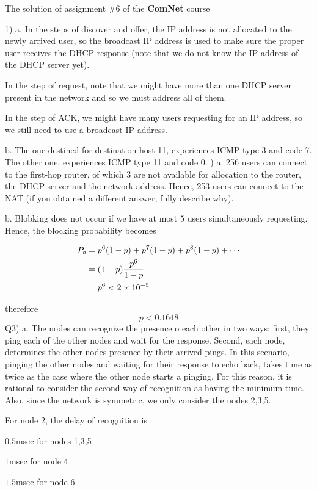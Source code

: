 \documentclass[10pt,letterpaper]{article}
\newcommand{\eqn}[2]{
\begin{equation}
\begin{split}
#1
\label{#2}
\end{split}
\end{equation}
}
\begin{document}
\Large
\begin{center}
The solution of assignment \#6 of the \textbf{ComNet} course
\end{center}
1) a. In the steps of discover and offer, the IP address is not allocated to the newly arrived user, so the broadcast IP address is used to make sure the proper user receives the DHCP response (note that we do not know the IP address of the DHCP server yet).

In the step of request, note that we might have more than one DHCP server present in the network and so we must address all of them.

In the step of ACK, we might have many users requesting for an IP address, so we still need to use a broadcast IP address.

b. The one destined for destination host 11, experiences ICMP type 3 and code 7. The other one, experiences ICMP type 11 and code 0.
\newline{})
a. 256 users can connect to the first-hop router, of which 3 are not available for allocation to the router, the DHCP server and the network address. Hence, 253 users can connect to the NAT (if you obtained a different answer, fully describe why).

b. Blobking does not occur if we have at most $5$ users simultaneously requesting. Hence, the blocking probability becomes
\eqn{
P_b&=p^6(1-p)+p^7(1-p)+p^8(1-p)+\cdots
\\&=(1-p){p^6\over 1-p}
\\&=p^6<2\times 10^{-5}
}{}
therefore
$$
p<0.1648
$$
\newline\newline
Q3) 
a. The nodes can recognize the presence o each other in two ways: first, they ping each of the other nodes and wait for the response. Second, each node, determines the other nodes presence by their arrived pings. In this scenario, pinging the other nodes and waiting for their response to echo back, takes time as twice as the case where the other node starts a pinging.  For this reason, it is rational to consider the second way of recognition as having the minimum time. Also, since the network is symmetric, we only consider the nodes 2,3,5.

For node $2$, the delay of recognition is

$0.5$msec for nodes 1,3,5

$1$msec for node 4

$1.5$msec for node 6
\end{document}
